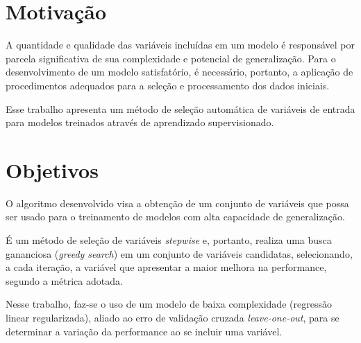 \section{Motivação}
A quantidade e qualidade das variáveis incluídas em um modelo é responsável por parcela significativa de sua complexidade e potencial de generalização. Para o desenvolvimento de um modelo satisfatório, é necessário, portanto, a aplicação de procedimentos adequados para a seleção e processamento dos dados iniciais.

Esse trabalho apresenta um método de seleção automática de variáveis de entrada para modelos treinados através de aprendizado supervisionado.

\section{Objetivos}

 O algoritmo desenvolvido visa a obtenção de um conjunto de variáveis que possa ser usado para o treinamento de modelos com alta capacidade de generalização. 
 
 É um método de seleção de variáveis \textit{stepwise} e, portanto, realiza uma busca gananciosa (\textit{greedy search}) em um conjunto de variáveis candidatas, selecionando, a cada iteração, a variável que apresentar a maior melhora na performance, segundo a métrica adotada.
 
Nesse trabalho, faz-se o uso de um modelo de baixa complexidade (regressão linear regularizada), aliado ao erro de validação cruzada \textit{leave-one-out}, para se determinar a variação da performance ao se incluir uma variável.